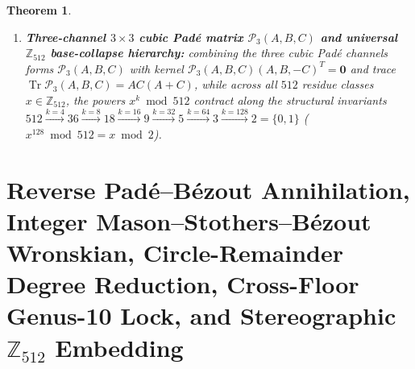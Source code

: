 \documentclass[11pt,a4paper]{article}
\theoremstyle{plain}
\newtheorem{theorem}{Theorem}[section]
\theoremstyle{definition}
\begin{document}
\begin{theorem}
\begin{enumerate}[label=\textbf{(\roman*)},leftmargin=*]
\item \textbf{Three-channel $3\times 3$ cubic Pad\'e matrix $\mathcal{P}_3(A,B,C)$ and universal $\mathbb{Z}_{512}$ base-collapse hierarchy:}
  combining the three cubic Pad\'e channels forms $\mathcal{P}_3(A,B,C)$ with kernel $\mathcal{P}_3(A,B,C)(A,B,-C)^T = \mathbf{0}$ and trace $\operatorname{Tr}\mathcal{P}_3(A,B,C) = A C(A+C)$, while across all $512$ residue classes $x\in\mathbb{Z}_{512}$, the powers $x^k\bmod 512$ contract along the structural invariants $512\xrightarrow{k=4} 36\xrightarrow{k=8} 18\xrightarrow{k=16} 9\xrightarrow{k=32} 5\xrightarrow{k=64} 3\xrightarrow{k=128} 2 = \{0,1\}$ ($x^{128}\bmod 512 = x\bmod 2$).
\end{enumerate}
\end{theorem}

\section{Reverse Pad\'e--B\'ezout Annihilation, Integer Mason--Stothers--B\'ezout Wronskian, Circle-Remainder Degree Reduction, Cross-Floor Genus-10 Lock, and Stereographic \texorpdfstring{$\mathbb{Z}_{512}$}{Z512} Embedding}
\label{sec:universal-theorems}
\end{document}
